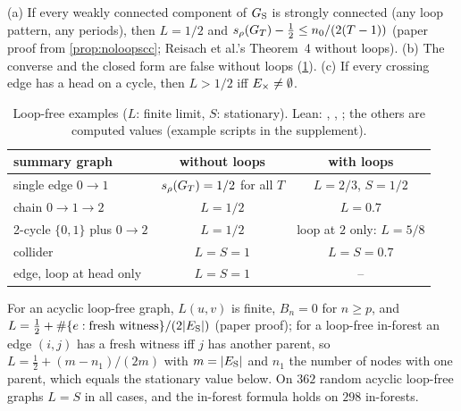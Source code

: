 \begin{corollary}\label{cor:noloopmain}
(a) If every weakly connected component of $G_{\mathrm S}$ is strongly connected (any
loop pattern, any periods), then $L=1/2$ and $s_\rho(G_T)-\tfrac12\le n_0/(2(T-1))$
(paper proof from \cref{prop:noloopscc}; Reisach et al.'s Theorem~4 without
loops). (b) The converse and the closed form are false without loops
(\cref{tab:noloop}). (c) If every crossing edge has a head on a cycle, then
$L>1/2$ iff $E_{\times}\ne\emptyset$.
\end{corollary}
\begin{table}[h]
\caption{Loop-free examples ($L$: finite limit, $S$: stationary). Lean: , , ; the others are computed values (example scripts in the supplement).}
\label{tab:noloop}
\centering
\begin{tabular}{lcc}
\toprule
summary graph & without loops & with loops \\
\midrule
single edge $0\to1$ & $s_\rho(G_T)=1/2$ for all $T$ & $L=2/3$, $S=1/2$ \\
chain $0\to1\to2$ & $L=1/2$ & $L=0.7$ \\
2-cycle $\{0,1\}$ plus $0\to2$ & $L=1/2$ & loop at $2$ only: $L=5/8$ \\
collider & $L=S=1$ & $L=S=0.7$ \\
edge, loop at head only & $L=S=1$ & -- \\
\bottomrule
\end{tabular}
\end{table}
For an acyclic loop-free graph, $L(u,v)$ is
finite, $B_n=0$ for $n\ge p$, and $L=\tfrac12+\#\{e:\text{fresh witness}\}/(2|E_{\mathrm S}|)$
(paper proof); for a loop-free in-forest an edge $(i,j)$ has a fresh witness iff
$j$ has another parent, so $L=\tfrac12+(m-n_1)/(2m)$ with $m=|E_{\mathrm S}|$ and $n_1$ the
number of nodes with one parent, which equals the stationary value below. On
$362$ random acyclic loop-free graphs $L=S$ in all cases, and the in-forest
formula holds on $298$ in-forests.

